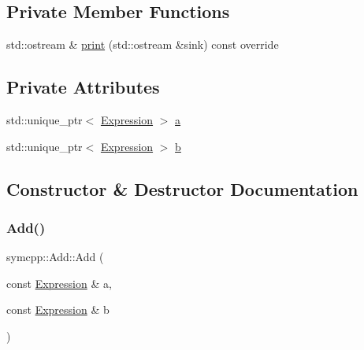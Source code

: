 \subsection*{Private Member Functions}
\begin{DoxyCompactItemize}
\item 
std\+::ostream \& \mbox{\hyperlink{classsymcpp_1_1Add_a4e73df4d72972d00ab139c5db4a93a0b}{print}} (std\+::ostream \&sink) const override
\end{DoxyCompactItemize}
\subsection*{Private Attributes}
\begin{DoxyCompactItemize}
\item 
std\+::unique\+\_\+ptr$<$ \mbox{\hyperlink{classsymcpp_1_1Expression}{Expression}} $>$ \mbox{\hyperlink{classsymcpp_1_1Add_a9c4fbbc6d99a6625e08e141d4f2bc615}{a}}
\item 
std\+::unique\+\_\+ptr$<$ \mbox{\hyperlink{classsymcpp_1_1Expression}{Expression}} $>$ \mbox{\hyperlink{classsymcpp_1_1Add_af79047cdc26b03c717544e86df5590a6}{b}}
\end{DoxyCompactItemize}


\subsection{Constructor \& Destructor Documentation}
\mbox{\label{classsymcpp_1_1Add_a037075ce08cb010b8873724279ebc9f7}} 
\subsubsection{\texorpdfstring{Add()}{Add()}\hspace{0.1cm}{\footnotesize\ttfamily [1/2]}}
{\footnotesize\ttfamily symcpp\+::\+Add\+::\+Add (\begin{DoxyParamCaption}\item[{const \mbox{\hyperlink{classsymcpp_1_1Expression}{Expression}} \&}]{a,  }\item[{const \mbox{\hyperlink{classsymcpp_1_1Expression}{Expression}} \&}]{b }\end{DoxyParamCaption})}

\mbox{\label{classsymcpp_1_1Add_aee8c8948ed62d1d59d65053da6370caf}} 
